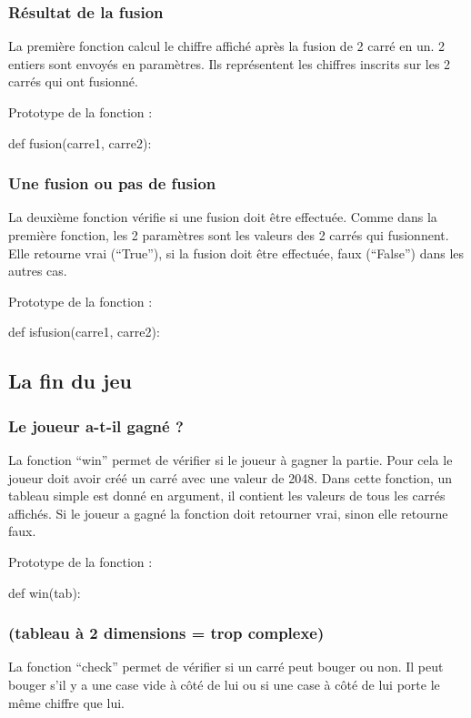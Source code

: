 \subsubsection{Résultat de la fusion}
La première fonction calcul le chiffre affiché après la fusion de  2 carré en un.
2 entiers sont envoyés en paramètres. Ils représentent les chiffres inscrits sur les 2 carrés qui ont fusionné. 

Prototype de la fonction :
\begin{pythonCode}
def fusion(carre1, carre2):
\end{pythonCode}


\subsubsection{Une fusion ou pas de fusion}
La deuxième fonction vérifie si une fusion doit être effectuée. 
Comme dans la première fonction, les 2 paramètres sont les valeurs des 2 carrés qui fusionnent. 
Elle retourne vrai (“True”), si la fusion doit être effectuée, faux (“False”) dans les autres cas.


Prototype de la fonction :
\begin{pythonCode}
def isfusion(carre1, carre2):
\end{pythonCode}






\subsection{La fin du jeu}
\subsubsection{Le joueur a-t-il gagné ?}
La fonction “win” permet de vérifier si le joueur à gagner la partie. Pour cela le joueur doit avoir créé un carré avec une valeur de 2048.
Dans cette fonction, un tableau simple est donné en argument, il contient les valeurs de tous les carrés affichés.
Si le joueur a gagné la fonction doit retourner vrai, sinon elle retourne faux. 

Prototype de la fonction :
\begin{pythonCode}
def win(tab):
\end{pythonCode}




\subsubsection{(tableau à 2 dimensions = trop complexe)}
La fonction “check” permet de vérifier si un carré peut bouger ou non. Il peut bouger s'il y a une case vide à côté de lui ou si une case à côté de lui porte le même chiffre que lui. 


